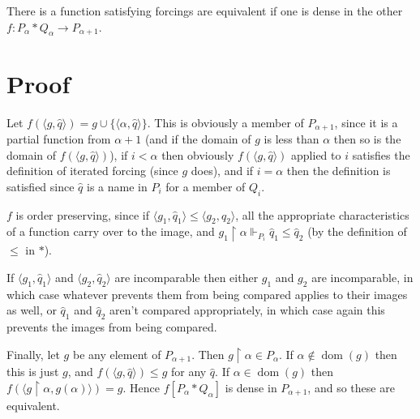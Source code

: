 \documentclass[12pt]{article}
\begin{document}
There is a function satisfying forcings are equivalent if one is dense in the other $f:P_{\alpha}*Q_\alpha\rightarrow P_{\alpha+1}$.

\section*{Proof}

Let $f(\langle g,\hat{q}\rangle)=g\cup\{\langle \alpha,\hat{q}\rangle\}$.  This is obviously a member of $P_{\alpha+1}$, since it is a partial function from $\alpha+1$ (and if the domain of $g$ is less than $\alpha$ then so is the domain of $f(\langle g,\hat{q}\rangle)$), if $i<\alpha$ then obviously $f(\langle g,\hat{q}\rangle)$ applied to $i$ satisfies the definition of iterated forcing (since $g$ does), and if $i=\alpha$ then the definition is satisfied since $\hat{q}$ is a name in $P_i$ for a member of $Q_i$.

$f$ is order preserving, since if $\langle g_1,\hat{q}_1\rangle\leq \langle g_2,\hat{q}_2\rangle$, all the appropriate characteristics of a function carry over to the image, and $g_1\upharpoonright\alpha\Vdash_{P_i} \hat{q}_1\leq \hat{q}_2$ (by the definition of $\leq$ in $*$).

If $\langle g_1,\hat{q}_1\rangle$ and $\langle g_2,\hat{q}_2\rangle$ are incomparable then either $g_1$ and $g_2$ are incomparable, in which case whatever prevents them from being compared applies to their images as well, or $\hat{q}_1$ and $\hat{q}_2$ aren't compared appropriately, in which case again this prevents the images from being compared.

Finally, let $g$ be any element of $P_{\alpha+1}$.  Then $g\upharpoonright\alpha\in P_\alpha$.  If $\alpha\notin \operatorname{dom}(g)$ then this is just $g$, and $f(\langle g,\hat{q}\rangle)\leq g$ for any $\hat{q}$.  If $\alpha\in\operatorname{dom}(g)$ then $f(\langle g\upharpoonright\alpha,g(\alpha)\rangle)=g$.  Hence $f[P_\alpha*Q_\alpha]$ is dense in $P_{\alpha+1}$, and so these are equivalent.
\end{document}
